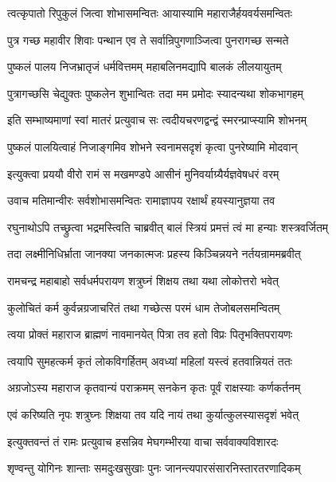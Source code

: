\twolineshloka
{त्वत्कृपातो रिपुकुलं जित्वा शोभासमन्वितः}
{आयास्यामि महाराजैर्हयवर्यसमन्वितः}%


\twolineshloka
{पुत्र गच्छ महावीर शिवाः पन्थान एव ते}
{सर्वान्रिपुगणाञ्जित्वा पुनरागच्छ सन्मते}%

\twolineshloka
{पुष्कलं पालय निजभ्रातृजं धर्मवित्तमम्}
{महाबलिनमद्यापि बालकं लीलयायुतम्}%

\twolineshloka
{पुत्रागच्छसि चेद्युक्तः पुष्कलेन शुभान्वितः}
{तदा मम प्रमोदः स्यादन्यथा शोकभागहम्}%

\twolineshloka
{इति सम्भाष्यमाणां स्वां मातरं प्रत्युवाच सः}
{त्वदीयचरणद्वन्द्वं स्मरन्प्राप्स्यामि शोभनम्}%

\twolineshloka
{पुष्कलं पालयित्वाहं निजाङ्गमिव शोभने}
{स्वनामसदृशं कृत्वा पुनरेष्यामि मोदवान्}%

\twolineshloka
{इत्युक्त्वा प्रययौ वीरो रामं स मखमण्डपे}
{आसीनं मुनिवर्याग्र्यैर्यज्ञवेषधरं वरम्}%

\twolineshloka
{उवाच मतिमान्वीरः सर्वशोभासमन्वितः}
{रामाज्ञापय रक्षार्थं हयस्यानुज्ञया तव}%

\twolineshloka
{रघुनाथोऽपि तच्छ्रुत्वा भद्रमस्त्विति चाब्रवीत्}
{बालं स्त्रियं प्रमत्तं त्वं मा हन्याः शस्त्रवर्जितम्}%

\twolineshloka
{तदा लक्ष्मीनिधिर्भ्राता जानक्या जनकात्मजः}
{प्रहस्य किञ्चिन्नयने नर्तयन्राममब्रवीत्}%


\twolineshloka
{रामचन्द्र महाबाहो सर्वधर्मपरायण}
{शत्रुघ्नं शिक्षय तथा यथा लोकोत्तरो भवेत्}%

\twolineshloka
{कुलोचितं कर्म कुर्वन्नग्रजाचरितं तथा}
{गच्छेत्स परमं धाम तेजोबलसमन्वितम्}%

\twolineshloka
{त्वया प्रोक्तं महाराज ब्राह्मणं नावमानयेत्}
{पित्रा तव हतो विप्रः पितृभक्तिपरायणः}%

\twolineshloka
{त्वयापि सुमहत्कर्म कृतं लोकविगर्हितम्}
{अवध्यां महिलां यस्त्वं हतवान्नियतं ततः}%

\twolineshloka
{अग्रजोऽस्य महाराज कृतवान्यं पराक्रमम्}
{सनकेन कृतः पूर्वं राक्षस्याः कर्णकर्तनम्}%

\twolineshloka
{एवं करिष्यति नृपः शत्रुघ्नः शिक्षया तव}
{यदि नायं तथा कुर्यात्कुलस्यासदृशं भवेत्}%

\twolineshloka
{इत्युक्तवन्तं तं रामः प्रत्युवाच हसन्निव}
{मेघगम्भीरया वाचा सर्ववाक्यविशारदः}%

\twolineshloka
{शृण्वन्तु योगिनः शान्ताः समदुःखसुखाः पुनः}
{जानन्त्यपारसंसारनिस्तारतरणादिकम्}%

